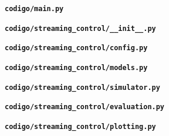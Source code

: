 \clearpage
\appendix
\singlespacing
{}
{}


\newcommand{\codigomodulo}[2]{%
  \par\vspace{1.5pt}%
  {\noindent\fontsize{5.2}{6.0}\selectfont\bfseries\texttt{#1}\par\vspace{0.5pt}}%
}

\codigomodulo{codigo/main.py}{../codigo/main.py}
\codigomodulo{codigo/streaming\_control/\_\_init\_\_.py}{../codigo/streaming_control/__init__.py}
\codigomodulo{codigo/streaming\_control/config.py}{../codigo/streaming_control/config.py}
\codigomodulo{codigo/streaming\_control/models.py}{../codigo/streaming_control/models.py}
\codigomodulo{codigo/streaming\_control/simulator.py}{../codigo/streaming_control/simulator.py}
\codigomodulo{codigo/streaming\_control/evaluation.py}{../codigo/streaming_control/evaluation.py}
\codigomodulo{codigo/streaming\_control/plotting.py}{../codigo/streaming_control/plotting.py}

